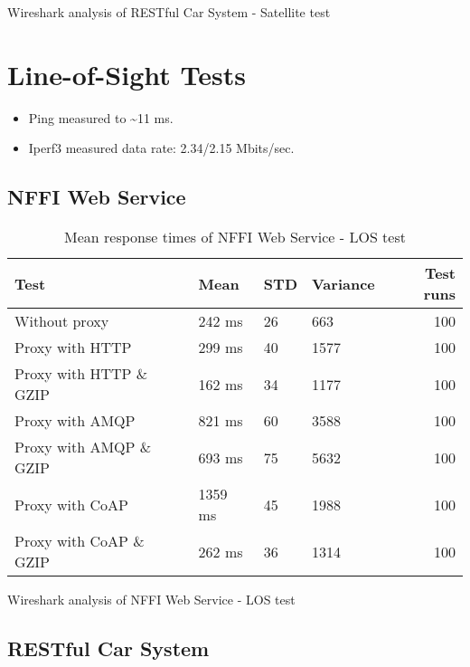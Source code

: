 \begin{appendices}
\begin{table}[H]

\caption{Wireshark analysis of RESTful Car System - Satellite test}
\end{table}


\section{Line-of-Sight Tests}

\begin{itemize}
	\item Ping measured to \textasciitilde 11 ms.
	\item Iperf3 measured data rate: 2.34/2.15 Mbits/sec.
\end{itemize}

\subsection{NFFI Web Service}

\begin{table}[H]
\begin{tabular}{llllr}
\hline
 Test                   &   Mean &   STD &   Variance &   Test runs \\
\hline
  Without proxy & 242 ms & 26 & 663 & 100 \\
  Proxy with HTTP & 299 ms & 40 & 1577 & 100 \\
  Proxy with HTTP \& GZIP & 162 ms & 34 & 1177 & 100 \\
  Proxy with AMQP & 821 ms & 60 & 3588 & 100 \\
  Proxy with AMQP \& GZIP & 693 ms & 75 & 5632 & 100\\
  Proxy with CoAP & 1359 ms & 45 & 1988 & 100 \\
  Proxy with CoAP \& GZIP & 262 ms & 36 & 1314 & 100 \\
\end{tabular}
\caption{Mean response times of NFFI Web Service - LOS test}
\end{table}

\begin{table}[H]

\caption{Wireshark analysis of NFFI Web Service - LOS test}
\end{table}


\subsection{RESTful Car System}


\end{appendices}
